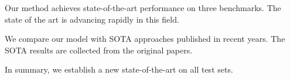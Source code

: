 Our method achieves state-of-the-art performance on three benchmarks. The state of the art is advancing rapidly in this field.

We compare our model with SOTA approaches published in recent years. The SOTA results are collected from the original papers.

In summary, we establish a new state-of-the-art on all test sets.
